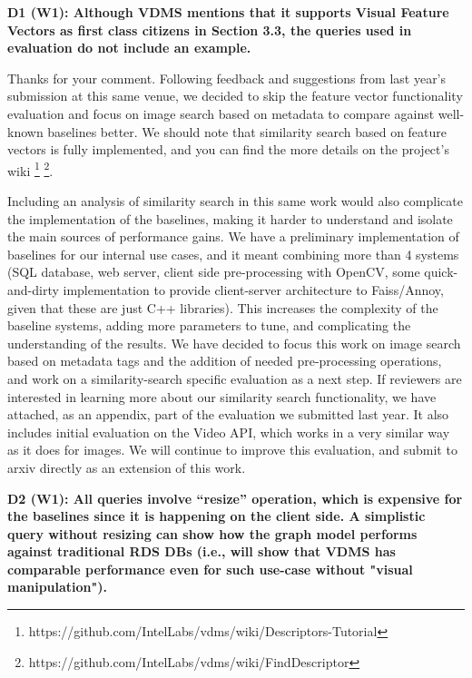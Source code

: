 \documentclass[11pt]{proposalnsf}
\begin{document}
\noindent %
\textbf{
D1 (W1): Although VDMS mentions that it supports Visual Feature Vectors as
first class citizens in Section 3.3, the queries used in evaluation
do not include an example.
}\bigskip

Thanks for your comment.
Following feedback and suggestions from last year's submission at this same venue,
we decided to skip the feature vector functionality evaluation and
focus on image search based on metadata to compare
against well-known baselines better.
We should note that similarity search based on feature vectors
is fully implemented, and you can find the more details on the project's wiki
\footnote{https://github.com/IntelLabs/vdms/wiki/Descriptors-Tutorial}
\footnote{https://github.com/IntelLabs/vdms/wiki/FindDescriptor}.

Including an analysis of similarity search in this same work would also
complicate the implementation of the baselines, making it harder to understand
and isolate the main sources of performance gains.
We have a preliminary implementation of baselines for our internal use cases,
and it meant combining more than 4 systems (SQL database, web server, client side
pre-processing with OpenCV, some quick-and-dirty implementation
to provide client-server architecture to Faiss/Annoy, given that these
are just C++ libraries).
This increases the complexity of the baseline systems, adding
more parameters to tune, and complicating the understanding of the results.
We have decided to focus this work on image search based on metadata tags
and the addition of needed pre-processing operations, and
work on a similarity-search specific evaluation as a next step.
If reviewers are interested in learning more about our similarity search functionality,
we have attached, as an appendix, part of the evaluation we submitted last year.
It also includes initial evaluation on the Video API, which works in a very
similar way as it does for images.
We will continue to improve this evaluation, and submit to arxiv directly
as an extension of this work.

\bigskip
\noindent %
\textbf{
D2 (W1): All queries involve “resize” operation, which is expensive for the
baselines since it is happening on the client side.
A simplistic query without resizing can show how the graph model performs
against traditional RDS DBs (i.e., will show that VDMS has comparable
performance even for such use-case without "visual manipulation").
}\bigskip
\end{document}

